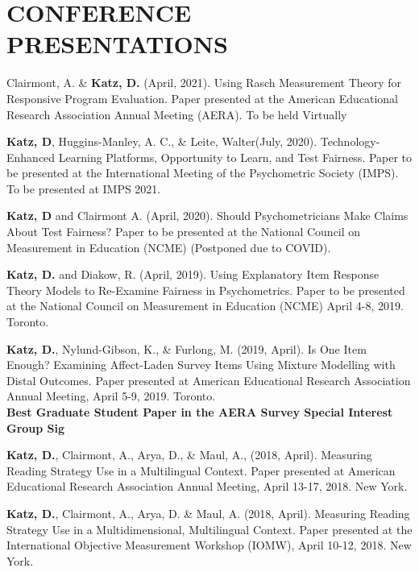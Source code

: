 \documentclass[12pt, oneside,]{memoir}
\begin{document}
\hypertarget{conference-presentations}{%
\section{CONFERENCE PRESENTATIONS}\label{conference-presentations}}
\begin{hangparas}{.25in}{1}
Clairmont, A. \& \textbf{Katz, D.} (April, 2021). Using Rasch Measurement Theory for Responsive Program Evaluation. Paper presented at the American Educational Research Association Annual Meeting (AERA). To be held Virtually

\textbf{Katz, D}, Huggins-Manley, A. C., \& Leite, Walter(July, 2020). Technology-Enhanced Learning Platforms, Opportunity to Learn, and Test Fairness. Paper to be presented at the International Meeting of the Psychometric Society (IMPS). To be presented at IMPS 2021.

\textbf{Katz, D} and Clairmont A. (April, 2020). Should Psychometricians Make Claims About Test Fairness? Paper to be presented at the National Council on Measurement in Education
(NCME) (Postponed due to COVID).

\textbf{Katz, D.} and Diakow, R. (April, 2019). Using Explanatory Item
Response Theory Models to Re-Examine Fairness in Psychometrics. Paper
to be presented at the National Council on Measurement in Education
(NCME) April 4-8, 2019. Toronto.

\noindent \textbf{Katz, D.}, Nylund-Gibson, K., \& Furlong, M. (2019, April). Is One
Item Enough? Examining Affect-Laden Survey Items Using Mixture
Modelling with Distal Outcomes. Paper presented at American
Educational Research Association Annual Meeting, April 5-9, 2019.
Toronto.\\
\textbf{Best Graduate Student Paper in the AERA Survey Special Interest
Group Sig}

\noindent \textbf{Katz, D.}, Clairmont, A., Arya, D., \& Maul, A., (2018, April).
Measuring Reading Strategy Use in a Multilingual Context. Paper
presented at American Educational Research Association Annual Meeting,
April 13-17, 2018. New York.

\noindent \textbf{Katz, D.}, Clairmont, A., Arya, D. \& Maul, A. (2018, April).
Measuring Reading Strategy Use in a Multidimensional, Multilingual
Context. Paper presented at the International Objective Measurement
Workshop (IOMW), April 10-12, 2018. New York.
\end{hangparas}
\vspace{4mm}
\end{document}
